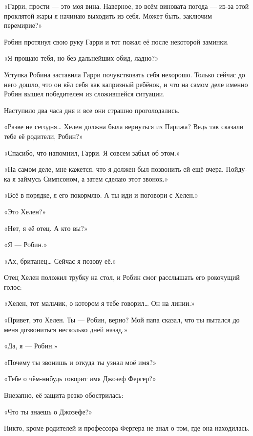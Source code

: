 \documentclass[a4paper,12pt]{book}
\begin{document}
\par
«Гарри, прости — это моя вина. Наверное, во всём виновата погода — из-за этой проклятой жары я начинаю выходить из себя. Может быть, заключим перемирие?»
\par
Робин протянул свою руку Гарри и тот пожал её после некоторой заминки.
\par
«Я прощаю тебя, но без дальнейших обид, ладно?»
\par
Уступка Робина заставила Гарри почувствовать себя нехорошо. Только сейчас до него дошло, что он вёл себя как капризный ребёнок, и что на самом деле именно Робин вышел победителем из сложившейся ситуации.
\par
Наступило два часа дня и все они страшно проголодались.
\par
«Разве не сегодня… Хелен должна была вернуться из Парижа? Ведь так сказали тебе её родители, Робин?»
\par
«Спасибо, что напомнил, Гарри. Я совсем забыл об этом.»
\par
«На самом деле, мне кажется, что я должен был позвонить ей ещё вчера. Пойду-ка я займусь Симпсоном, а затем сделаю этот звонок.»
\par
«Всё в порядке, я его покормлю. А ты иди и поговори с Хелен.»\\
\par
«Это Хелен?»
\par
«Нет, я её отец. А кто вы?»
\par
«Я — Робин.»
\par
«Ах, британец… Сейчас я позову её.»
\par
Отец Хелен положил трубку на стол, и Робин смог расслышать его рокочущий голос:
\par
«Хелен, тот мальчик, о котором я тебе говорил… Он на линии.»\\
\par
«Привет, это Хелен. Ты — Робин, верно? Мой папа сказал, что ты пытался до меня дозвониться несколько дней назад.»
\par
«Да, я — Робин.»
\par
«Почему ты звонишь и откуда ты узнал моё имя?»
\par
«Тебе о чём-нибудь говорит имя Джозеф Фергер?»
\par
Внезапно, её защита резко обострилась:
\par
«Что ты знаешь о Джозефе?»
\par
Никто, кроме родителей и профессора Фергера не знал о том, где она находилась.
\par
\end{document}
